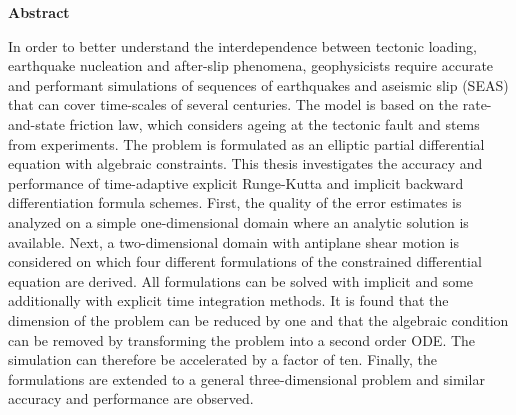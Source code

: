 \clearemptydoublepage
{}
{}

\vspace*{2cm}
\begin{center}
{\Large \textbf{Abstract}}
\end{center}
\vspace{1cm}

In order to better understand the interdependence between tectonic loading, earthquake nucleation and after-slip phenomena, geophysicists require accurate and performant simulations of sequences of earthquakes and aseismic slip (SEAS) that can cover time-scales of several centuries. The model is based on the rate-and-state friction law, which considers ageing at the tectonic fault and stems from experiments. The problem is formulated as an elliptic partial differential equation with algebraic constraints. This thesis investigates the accuracy and performance of time-adaptive explicit Runge-Kutta and implicit backward differentiation formula schemes. First, the quality of the error estimates is analyzed on a simple one-dimensional domain where an analytic solution is available. Next, a two-dimensional domain with antiplane shear motion is considered on which four different formulations of the constrained differential equation are derived. All formulations can be solved with implicit and some additionally with explicit time integration methods. It is found that the dimension of the problem can be reduced by one and that the algebraic condition can be removed by transforming the problem into a second order ODE. The simulation can therefore be accelerated by a factor of ten. Finally, the formulations are extended to a general three-dimensional problem and similar accuracy and performance are observed.